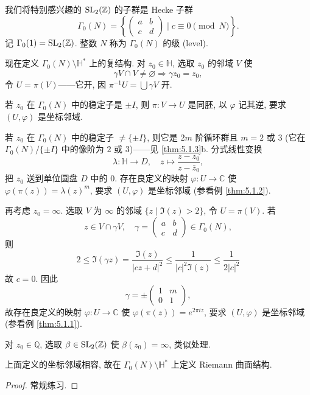 我们将特别感兴趣的 $\operatorname{SL}_2(\mathbb{Z})$ 的子群是 Hecke 子群
\[
\Gamma_0(N) = \left\{\begin{pmatrix}a & b\\ c & d\end{pmatrix}\;\Big|\; c\equiv 0\pmod{N}\right\}.
\]
记 $\Gamma_0(1) = \operatorname{SL}_2(\mathbb{Z})$. 整数 $N$ 称为 $\Gamma_0(N)$ 的级 (level).

现在定义 $\Gamma_0(N)\setminus\mathbb{H}^*$ 上的复结构. 对 $z_0\in\mathbb{H}$, 选取 $z_0$ 的邻域 $V$ 使
\[
\gamma V\cap V\neq\varnothing\Rightarrow\gamma z_0 = z_0,
\]
令 $U = \pi(V)$——它开, 因 $\pi^{-1}U = \bigcup\gamma V$ 开.

若 $z_0$ 在 $\Gamma_0(N)$ 中的稳定子是 $\pm I$, 则 $\pi\colon V\to U$ 是同胚, 以 $\varphi$ 记其逆, 要求 $(U, \varphi)$ 是坐标邻域.

若 $z_0$ 在 $\Gamma_0(N)$ 中的稳定子 $\neq\{\pm I\}$, 则它是 $2m$ 阶循环群且 $m = 2$ 或 $3$ (它在 $\Gamma_0(N)/\{\pm I\}$ 中的像阶为 $2$ 或 $3$)——见 \ref{thm:5.1.3}b. 分式线性变换
\[
\lambda\colon\mathbb{H}\to D, \quad z\mapsto\frac{z - z_0}{z - \bar{z}_0},
\]
把 $z_0$ 送到单位圆盘 $D$ 中的 $0$. 存在良定义的映射 $\varphi\colon U\to\mathbb{C}$ 使 $\varphi(\pi(z)) = \lambda(z)^m$, 要求 $(U, \varphi)$ 是坐标邻域 (参看例 \ref{thm:5.1.2}).

再考虑 $z_0 = \infty$. 选取 $V$ 为 $\infty$ 的邻域 $\{z\mid \Im(z) > 2\}$, 令 $U = \pi(V)$. 若
\[
z\in V\cap\gamma V, \quad \gamma = \begin{pmatrix}a & b\\ c & d\end{pmatrix}\in\Gamma_0(N),
\]
则
\[
2\le\Im(\gamma z) = \frac{\Im(z)}{|cz + d|^2}\le\frac{1}{|c|^2\Im(z)}\le\frac{1}{2|c|^2}
\]
故 $c = 0$. 因此
\[
\gamma = \pm\begin{pmatrix}1 & m\\ 0 & 1\end{pmatrix},
\]
故存在良定义的映射 $\varphi\colon U\to\mathbb{C}$ 使 $\varphi(\pi(z)) = e^{2\pi iz}$, 要求 $(U, \varphi)$ 是坐标邻域 (参看例 \ref{thm:5.1.1}).

对 $z_0\in\mathbb{Q}$, 选取 $\beta\in\operatorname{SL}_2(\mathbb{Z})$ 使 $\beta(z_0) = \infty$, 类似处理.

\begin{proposition} \label{thm:5.1.8}
上面定义的坐标邻域相容, 故在 $\Gamma_0(N)\setminus\mathbb{H}^*$ 上定义 Riemann 曲面结构.
\end{proposition}

\begin{proof}
常规练习.
\end{proof}

